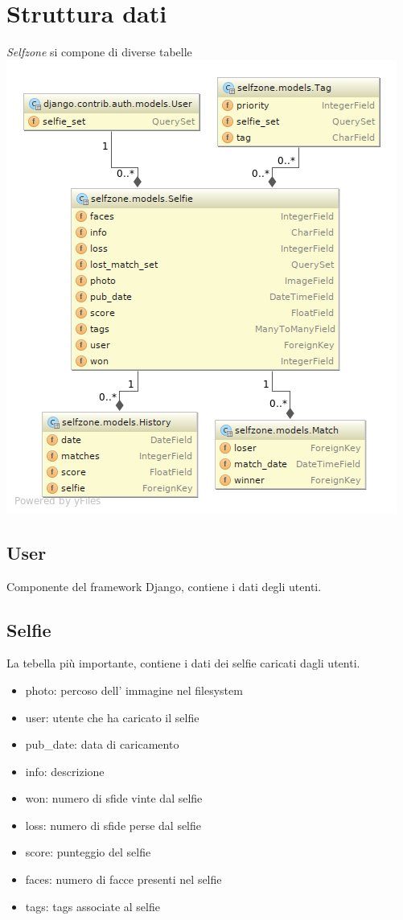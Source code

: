 \documentclass{article}
\newcommand{\proj}{\textit{Selfzone }}
\begin{document}
\section{Struttura dati}
\proj si compone di diverse tabelle\\
\includegraphics[width=\textwidth]{res/models_diagram.png}
\clearpage

\subsection{User}
Componente del framework Django, contiene i dati degli utenti.

\subsection{Selfie}
La tebella più importante, contiene i dati dei selfie caricati dagli utenti.
\begin{itemize}
\item photo: percoso dell' immagine nel filesystem
\item user: utente che ha caricato il selfie
\item pub\_date: data di caricamento
\item info: descrizione
\item won: numero di sfide vinte dal selfie
\item loss: numero di sfide perse dal selfie
\item score: punteggio del selfie
\item faces: numero di facce presenti nel selfie
\item tags: tags associate al selfie
\end{itemize}
\end{document}
